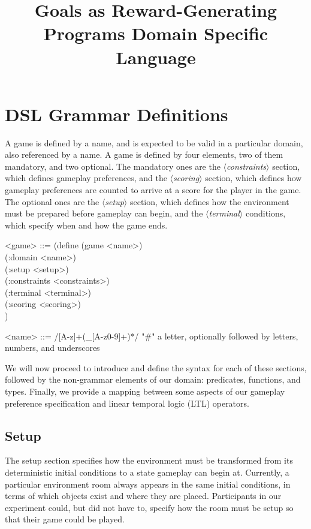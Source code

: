 \documentclass{article}
\title{Goals as Reward-Generating Programs Domain Specific Language}
\newcommand{\dsl}[1]{{\it $\langle$#1$\rangle$}}
\begin{document}
\maketitle

\section{DSL Grammar Definitions}

A game is defined by a name, and is expected to be valid in a particular domain, also referenced by a name.
A game is defined by four elements, two of them mandatory, and two optional.
The mandatory ones are the \dsl{constraints} section, which defines gameplay preferences, and the \dsl{scoring} section, which defines how gameplay preferences are counted to arrive at a score for the player in the game.
The optional ones are the \dsl{setup} section, which defines how the environment must be prepared before gameplay can begin, and the \dsl{terminal} conditions, which specify when and how the game ends.

\begin{grammar}
<game> ::= (define (game <name>) \\
  (:domain <name>) \\
  (:setup <setup>) \\
  (:constraints <constraints>) \\
  (:terminal <terminal>) \\
  (:scoring <scoring>) \\)

<name> ::= /[A-z]+(_[A-z0-9]+)*/ "#" a letter, optionally followed by letters, numbers, and underscores
\end{grammar}

We will now proceed to introduce and define the syntax for each of these sections, followed by the non-grammar elements of our domain: predicates, functions, and types.
Finally, we provide a mapping between some aspects of our gameplay preference specification and linear temporal logic (LTL) operators.

\subsection{Setup} \label{sec:setup}
The setup section specifies how the environment must be transformed from its deterministic initial conditions to a state gameplay can begin at.
Currently, a particular environment room always appears in the same initial conditions, in terms of which objects exist and where they are placed.
Participants in our experiment could, but did not have to, specify how the room must be setup so that their game could be played.
\end{document}

